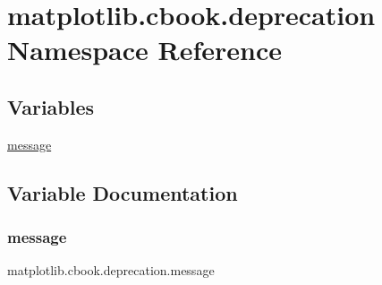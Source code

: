 \hypertarget{namespacematplotlib_1_1cbook_1_1deprecation}{}\section{matplotlib.\+cbook.\+deprecation Namespace Reference}
\label{namespacematplotlib_1_1cbook_1_1deprecation}
\subsection*{Variables}
\begin{DoxyCompactItemize}
\item 
\hyperlink{namespacematplotlib_1_1cbook_1_1deprecation_a7a689288ccca00a73cf047ad83c55890}{message}
\end{DoxyCompactItemize}


\subsection{Variable Documentation}
\mbox{\label{namespacematplotlib_1_1cbook_1_1deprecation_a7a689288ccca00a73cf047ad83c55890}} 
\subsubsection{\texorpdfstring{message}{message}}
{\footnotesize\ttfamily matplotlib.\+cbook.\+deprecation.\+message}

